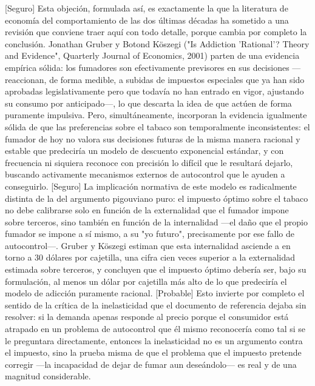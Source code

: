 \documentclass[10pt,a4paper]{article}
\begin{document}
[Seguro] Esta objeción, formulada así, es exactamente la que la literatura de economía del comportamiento de las dos últimas décadas ha sometido a una revisión que conviene traer aquí con todo detalle, porque cambia por completo la conclusión. Jonathan Gruber y Botond Köszegi ("Is Addiction 'Rational'? Theory and Evidence", Quarterly Journal of Economics, 2001) parten de una evidencia empírica sólida: los fumadores son efectivamente previsores en sus decisiones —reaccionan, de forma medible, a subidas de impuestos especiales que ya han sido aprobadas legislativamente pero que todavía no han entrado en vigor, ajustando su consumo por anticipado—, lo que descarta la idea de que actúen de forma puramente impulsiva. Pero, simultáneamente, incorporan la evidencia igualmente sólida de que las preferencias sobre el tabaco son temporalmente inconsistentes: el fumador de hoy no valora sus decisiones futuras de la misma manera racional y estable que predeciría un modelo de descuento exponencial estándar, y con frecuencia ni siquiera reconoce con precisión lo difícil que le resultará dejarlo, buscando activamente mecanismos externos de autocontrol que le ayuden a conseguirlo. [Seguro] La implicación normativa de este modelo es radicalmente distinta de la del argumento pigouviano puro: el impuesto óptimo sobre el tabaco no debe calibrarse solo en función de la externalidad que el fumador impone sobre terceros, sino también en función de la internalidad —el daño que el propio fumador se impone a sí mismo, a su "yo futuro", precisamente por ese fallo de autocontrol—. Gruber y Köszegi estiman que esta internalidad asciende a en torno a 30 dólares por cajetilla, una cifra cien veces superior a la externalidad estimada sobre terceros, y concluyen que el impuesto óptimo debería ser, bajo su formulación, al menos un dólar por cajetilla más alto de lo que predeciría el modelo de adicción puramente racional. [Probable] Esto invierte por completo el sentido de la crítica de la inelasticidad que el documento de referencia dejaba sin resolver: si la demanda apenas responde al precio porque el consumidor está atrapado en un problema de autocontrol que él mismo reconocería como tal si se le preguntara directamente, entonces la inelasticidad no es un argumento contra el impuesto, sino la prueba misma de que el problema que el impuesto pretende corregir —la incapacidad de dejar de fumar aun deseándolo— es real y de una magnitud considerable.
\end{document}
